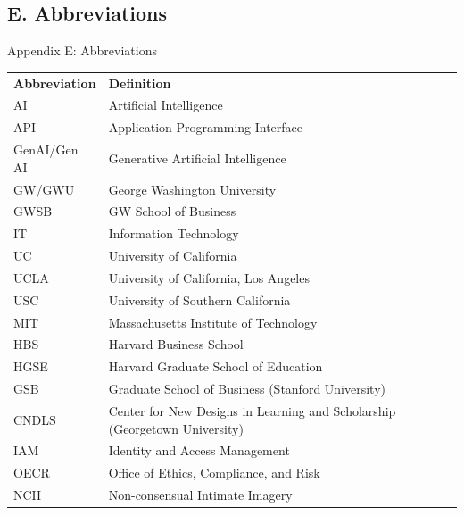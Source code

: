 \documentclass[aspectratio=169]{beamer}
\begin{document}
\subsection{E. Abbreviations}

\begin{frame}[t]{Appendix E: Abbreviations}
\tiny
\renewcommand{\arraystretch}{1.2}

\begin{tabular}{ll}
\textbf{Abbreviation} & \textbf{Definition} \\
AI & Artificial Intelligence \\
API & Application Programming Interface \\
GenAI/Gen AI & Generative Artificial Intelligence \\
GW/GWU & George Washington University \\
GWSB & GW School of Business \\
IT & Information Technology \\
UC & University of California \\
UCLA & University of California, Los Angeles \\
USC & University of Southern California \\
MIT & Massachusetts Institute of Technology \\
HBS & Harvard Business School \\
HGSE & Harvard Graduate School of Education \\
GSB & Graduate School of Business (Stanford University) \\
CNDLS & Center for New Designs in Learning and Scholarship (Georgetown University) \\
IAM & Identity and Access Management \\
OECR & Office of Ethics, Compliance, and Risk \\
NCII & Non-consensual Intimate Imagery \\
\end{tabular}

\end{frame}
\end{document}
